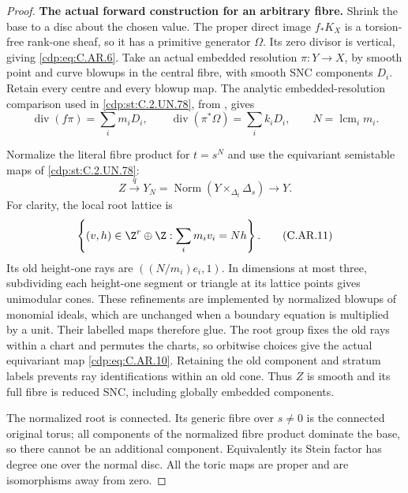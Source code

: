 \begin{proof}
\par\medskip\noindent\textbf{The actual forward construction for an arbitrary fibre.}
Shrink the base to a disc about the chosen value.
The proper direct image \(f_*K_X\) is a torsion-free
rank-one sheaf, so it has a primitive generator
\(\Omega\). Its zero divisor is vertical, giving
\eqref{cdp:eq:C.AR.6}. Take an actual embedded resolution
\(\pi:Y\to X\), by smooth point and curve blowups
in the central fibre, with smooth SNC components
\(D_i\). Retain every centre and every blowup map.
The analytic embedded-resolution comparison used
in \ref{cdp:st:C.2.UN.78}, from \cite{BierstoneMilman1997}, gives
\[
 \operatorname{div}(f\pi)=\sum_i m_iD_i,
 \qquad \operatorname{div}(\pi^*\Omega)=\sum_i k_iD_i,
 \qquad N=\operatorname{lcm}_i m_i.
 \tag{C.AR.9}\label{cdp:eq:C.AR.9}
\]

Normalize the literal fibre product for \(t=s^N\)
and use the equivariant semistable maps of \ref{cdp:st:C.2.UN.78}:
\[
 Z\xrightarrow{q}Y_N
     =\operatorname{Norm}(Y\times_{\Delta_t}\Delta_s)
                   \longrightarrow Y.
 \tag{C.AR.10}\label{cdp:eq:C.AR.10}
\]
For clarity, the local root lattice is
\[
 \left\{(v,h)\in\Z^r\oplus\Z:
                      \sum_i m_iv_i=Nh\right\}.
 \tag{C.AR.11}\label{cdp:eq:C.AR.11}
\]
Its old height-one rays are \(((N/m_i)e_i,1)\).
In dimensions at most three, subdividing each
height-one segment or triangle at its lattice
points gives unimodular cones. These refinements
are implemented by normalized blowups of
monomial ideals, which are unchanged when a
boundary equation is multiplied by a unit.
Their labelled maps therefore glue. The root
group fixes the old rays within a chart and
permutes the charts, so orbitwise choices give
the actual equivariant map \eqref{cdp:eq:C.AR.10}. Retaining
the old component and stratum labels prevents
ray identifications within an old cone. Thus
\(Z\) is smooth and its full fibre is reduced
SNC, including globally embedded components.

The normalized root is connected. Its generic
fibre over \(s\ne0\) is the connected original
torus; all components of the normalized fibre
product dominate the base, so there cannot be
an additional component. Equivalently its
Stein factor has degree one over the normal
disc. All the toric maps are proper and are
isomorphisms away from zero.


\end{proof}
